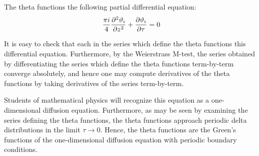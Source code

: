 \documentclass[12pt]{article}
\begin{document}
The theta functions  the following partial differential equation:
 $${\pi i \over 4} {\partial^2 \vartheta_i \over \partial z^2} + {\partial \vartheta_i \over \partial \tau} = 0$$

It is easy to check that each  in the series which define the theta functions  this differential equation.  Furthermore, by the Weierstrass M-test, the series obtained by differentiating the series which define the theta functions term-by-term converge absolutely, and hence one may compute derivatives of the theta functions by taking derivatives of the series term-by-term.

Students of mathematical physics will recognize this equation as a one-dimensional diffusion equation.  Furthermore, as may be seen by examining the series defining the theta functions, the theta functions approach periodic delta distributions in the limit $\tau \to 0$.  Hence, the theta functions are the Green's functions of the one-dimensional diffusion equation with periodic boundary conditions.
\end{document}
